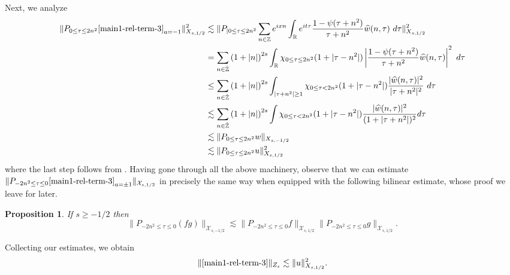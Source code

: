 \documentclass[12pt,reqno]{amsart}
\numberwithin{equation}{section}  %
\renewcommand{\cref}{\Cref}
\newcommand{\rr}{\mathbb{R}}
\newcommand{\zz}{\mathbb{Z}}
\newcommand{\zzdot}{\dot{\zz}}
\newcommand{\wh}{\widehat}
\newtheorem{proposition}[theorem]{Proposition}
\begin{document}
%
%
Next, we analyze
%
%
\begin{equation}
	\begin{split}
		\|P_{0 \le  \tau  \le 2n^{2}}\cref{main1-rel-term-3}_{a=-1}\|_{X_{s,1/2}}^{2} 
    & \lesssim
    \| P_{| 0 \le \tau \le 2n^{2}} \sum_{n \in \zz} e^{ixn} \int_\rr 
		e^{it \tau} \frac{1 - \psi (\tau + n^{2} ) 
}{\tau + n^{2}} \wh{w}(n, \tau) \ 
		d \tau\|_{X_{s,1/2}}^{2}
		\\
    & = \sum_{n \in \zzdot} \left (1 + |n| \right )^{2s} \int_\rr \chi_{0 \le \tau \le 2n^{2}}(1 + | \tau - n^{2} |)
    \left | \frac{1 - \psi(\tau + n^{2 
})}{\tau + n^{2}} 
     \wh{w}(n, \tau) \right |^2 \ d 
		\tau 
		\\
    & \le 
    \sum_{n \in \zzdot}  \left (1 + |n| \right )^{2s} \int_{| \tau + n^{2}| \ge 1} \chi_{0 \le  \tau  < 2n^{2}}(1 + | \tau - n^{2} |)
    \frac{|  \wh{w}(n, \tau)|^2}{|\tau + n^{2}|^2} 
		\ d 
		\tau 
		\\
& \lesssim
    \sum_{n \in \zzdot}  \left (1 + |n| \right )^{2s} \int \chi_{0 \le  \tau  < 2n^{2}} (1 + | \tau - n^{2} |)
    \frac{|  \wh{w}(n, \tau)|^2}{(1 + |\tau + n^{2}|)^2} d \tau
\\
		& \lesssim \| P_{0 \le  \tau \le 2n^{2}}w \|_{X_{s,-1/2}}
		\\
		& \lesssim \| P_{0 \le  \tau \le 2n^{2}}u \|^{2}_{X_{s,1/2}}
\end{split}
\end{equation}
where the last step follows from \cref{prop:bilinear-est2}. 
Having gone through all the above machinery, observe that we can estimate $\| P_{-2n^{2} \le \tau \le 0} \cref{main1-rel-term-3}_{a = \pm 1}\|_{\mathcal{X}_{s,1/2}}$ in precisely the same way when equipped with the following bilinear estimate, whose proof we leave for later. 
\begin{proposition}
	If $s \ge -1/2$ then 
	\begin{equation}
	  \| P_{-2n^{2} \le \tau \le 0}(fg) \|_{\mathcal{X}_{s,-1/2}}
		    \lesssim \|P_{-2n^{2} \le \tau \le 0}f\|_{\mathcal{X}_{s,1/2}} \|P_{-2n^{2} \le \tau \le 0}g\|_{\mathcal{X}_{s,1/2}}.
	\end{equation}
%
%
%
%
\end{proposition}
Collecting our estimates, we obtain%
\begin{equation}
	\begin{split}
    \|\cref{main1-rel-term-3}\|_{Z_{s}} \lesssim
    \|u\|^{2}_{X_{s,1/2}}.
	\end{split}
\end{equation}
%
%
%
%
%
\end{document}
